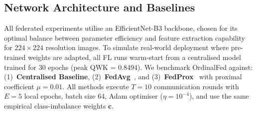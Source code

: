\subsection{Network Architecture and Baselines}

All federated experiments utilise an EfficientNet-B3 backbone, chosen for its
optimal balance between parameter efficiency and feature extraction capability for
$224 \times 224$ resolution images. To simulate real-world deployment where
pre-trained weights are adapted, all FL runs warm-start from a centralised model
trained for 30 epochs (peak QWK = 0.8494). We benchmark OrdinalFed against:
(1)~\textbf{Centralised Baseline}, (2)~\textbf{FedAvg}~\cite{mcmahan2017fedavg},
and (3)~\textbf{FedProx}~\cite{li2020fedprox} with proximal coefficient $\mu = 0.01$.
All methods execute $T = 10$ communication rounds with $E = 5$ local epochs,
batch size 64, Adam optimiser ($\eta = 10^{-4}$), and use the same empirical
class-imbalance weights $\mathbf{c}$.
